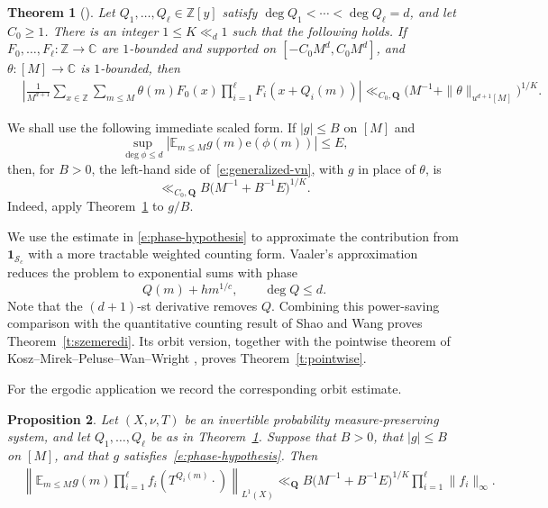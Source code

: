 \documentclass{amsart}
\newcommand{\E}{\mathbb E}
\newcommand{\Z}{\mathbb Z}
\newcommand{\C}{\mathbb C}
\newcommand{\1}{\mathbf 1}
\newcommand{\e}{\mathrm e}
\newtheorem{theorem}{Theorem}[section]
\newtheorem{proposition}[theorem]{Proposition}
\begin{document}
\begin{theorem}[\cite{Teravainen}]
\label{t:teravainen}
Let $Q_1,\ldots,Q_\ell\in\Z[y]$ satisfy
$\deg Q_1<\cdots<\deg Q_\ell=d$, and let $C_0\geq1$.  There is an
integer $1\leq K\ll_d1$ such that the following holds.  If
$F_0,\ldots,F_\ell:\Z\to\C$ are $1$-bounded and supported on
$[-C_0M^d,C_0M^d]$, and $\theta:[M]\to\C$ is $1$-bounded, then
\begin{align}\label{e:generalized-vn}
 &\left|\frac1{M^{d+1}}\sum_{x\in\Z}\sum_{m\leq M}
 \theta(m)F_0(x)\prod_{i=1}^{\ell}F_i(x+Q_i(m))\right|\ll_{C_0,\mathbf Q}
 \bigl(M^{-1}+\|\theta\|_{u^{d+1}[M]}\bigr)^{1/K}.
\end{align}
\end{theorem}
We shall use the
following immediate scaled form.  If $|g|\leq B$ on $[M]$ and
\begin{equation}\label{e:phase-hypothesis}
 \sup_{\deg\phi\leq d}
 \left|\E_{m\leq M}g(m)\e(\phi(m))\right|\leq E,
\end{equation}
then, for $B>0$, the left-hand side of~\eqref{e:generalized-vn}, with $g$ in place
of $\theta$, is
\begin{equation}\label{e:scaled-vn}
 \ll_{C_0,\mathbf Q}B\bigl(M^{-1}+B^{-1}E\bigr)^{1/K}.
\end{equation}
Indeed, apply Theorem~\ref{t:teravainen} to $g/B$.

We use the estimate in \eqref{e:phase-hypothesis} to approximate the contribution from $\mathbf{1}_{\mathcal{S}_{c}}$ with a more tractable weighted counting form.
Vaaler's approximation reduces the problem to exponential sums with phase
\[
 Q(m)+hm^{1/c},\qquad \deg Q\leq d.
\]
Note that the $(d+1)$-st derivative removes $Q$. Combining this power-saving comparison with the quantitative counting
result of Shao and Wang
\cite[Proposition~5.1 and Lemma 5.2]{ShaoWang} proves
Theorem~\ref{t:szemeredi}.  Its orbit version, together with the
pointwise theorem of Kosz--Mirek--Peluse--Wan--Wright
\cite[Theorem~1.3]{KMPWW}, proves Theorem~\ref{t:pointwise}.

For the ergodic application we record the corresponding orbit estimate.

\begin{proposition}\label{p:orbit}
Let $(X,\nu,T)$ be an invertible probability measure-preserving system,
and let $Q_1,\ldots,Q_\ell$ be as in
Theorem~\ref{t:teravainen}.  Suppose that $B>0$, that $|g|\leq B$ on
$[M]$, and that $g$ satisfies~\eqref{e:phase-hypothesis}.  Then
\begin{align}\label{e:orbit-transfer}
 &\left\|\E_{m\leq M}g(m)
 \prod_{i=1}^{\ell}f_i(T^{Q_i(m)}\cdot)\right\|_{L^1(X)}\ll_{\mathbf Q}B
 \bigl(M^{-1}+B^{-1}E\bigr)^{1/K}
 \prod_{i=1}^{\ell}\|f_i\|_\infty.
\end{align}
\end{proposition}
\end{document}
